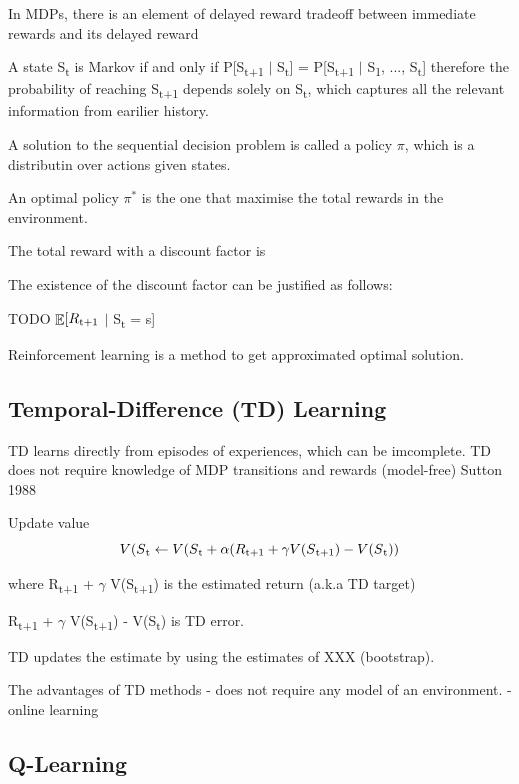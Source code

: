 \documentclass[12pt,twoside]{report}
\DeclareMathOperator{\E}{\mathbb{E}}
\begin{document}
In MDPs, there is an element of delayed reward tradeoff between immediate rewards and its delayed reward

A state S\textsubscript{t} is Markov if and only if
P[S\textsubscript{t+1} $\vert$ S\textsubscript{t}] = P[S\textsubscript{t+1} $\vert$ S\textsubscript{1}, ..., S\textsubscript{t}] therefore the probability of reaching S\textsubscript{t+1} depends solely on S\textsubscript{t}, which captures all the relevant information from earilier history.

A solution to the sequential decision problem is called a policy $\pi$, which is a distributin over actions given states.

An optimal policy $\pi^*$ is the one that maximise the total rewards in the environment.

The total reward with a discount factor is


The existence of the discount factor can be justified as follows:

TODO
$\displaystyle \E[R\textsubscript{t+1} $ $\vert$ S\textsubscript{t} = s]


Reinforcement learning is a method to get approximated optimal solution.


\subsection{Temporal-Difference (TD) Learning}

TD learns directly from episodes of experiences, which can be imcomplete.
TD does not require knowledge of MDP transitions and rewards (model-free)
Sutton 1988

Update value
\begin{equation}
V(S\textsubscript{t} \leftarrow V(S\textsubscript{t} + \alpha (R\textsubscript{t+1} + \gamma V(S\textsubscript{t+1}) - V(S\textsubscript{t}))
\end{equation}

where R\textsubscript{t+1} + $\gamma$ V(S\textsubscript{t+1}) is the estimated return (a.k.a TD target)

R\textsubscript{t+1} + $\gamma$ V(S\textsubscript{t+1}) - V(S\textsubscript{t}) is TD error.

TD updates the estimate by using the estimates of XXX (bootstrap).

The advantages of TD methods
- does not require any model of an environment.
- online learning
\subsection{Q-Learning}
\end{document}
